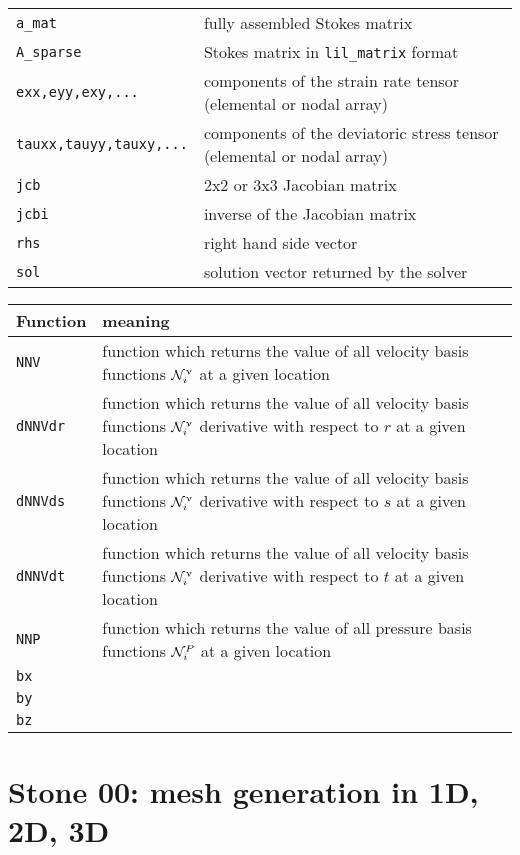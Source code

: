 \documentclass[a4paper,11pt]{report}
\begin{document}
\begin{tabular}{p{3.5cm}p{12.5cm}}
{\tt a\_mat}  & fully assembled Stokes matrix \\
{\tt A\_sparse} & Stokes matrix in {\tt lil\_matrix} format \\
{\tt exx,eyy,exy,...} & components of the strain rate tensor (elemental or nodal array)\\
{\tt tauxx,tauyy,tauxy,...} & components of the deviatoric stress tensor (elemental or nodal array)\\
{\tt jcb} & 2x2 or 3x3 Jacobian matrix \\
{\tt jcbi} & inverse of the Jacobian matrix \\
{\tt rhs} & right hand side vector \\
{\tt sol} & solution vector returned by the solver\\
\hline
\end{tabular}

\vspace{.5cm}

\begin{tabular}{p{2cm}p{14cm}}
\hline
Function & meaning \\
\hline
{\tt NNV}    & function which returns the value of all velocity basis functions 
               ${\cal N}_i^\upnu$ at a given location\\
{\tt dNNVdr} & function which returns the value of all velocity basis functions 
               ${\cal N}_i^\upnu$ derivative with respect to $r$ at a given location\\
{\tt dNNVds} & function which returns the value of all velocity basis functions 
               ${\cal N}_i^\upnu$ derivative with respect to $s$ at a given location\\
{\tt dNNVdt} & function which returns the value of all velocity basis functions 
               ${\cal N}_i^\upnu$ derivative with respect to $t$ at a given location\\
{\tt NNP}    & function which returns the value of all pressure basis functions 
               ${\cal N}_i^P$ at a given location\\
{\tt bx} & \\
{\tt by} & \\
{\tt bz} & \\
\hline
\end{tabular}



\chapter*{Stone 00: mesh generation in 1D, 2D, 3D \label{f00}} %
\end{document}
